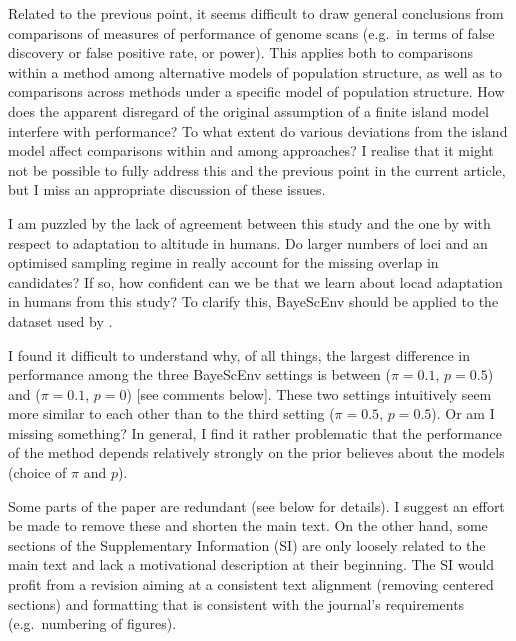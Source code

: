\documentclass[11pt]{article}
\newenvironment{my_enumerate}
{\begin{enumerate}
  \setlength{\itemsep}{2pt}
  \setlength{\parskip}{0pt}
  \setlength{\parsep}{0pt}}
{\end{enumerate}}
\begin{document}
\begin{my_enumerate}
	\item Related to the previous point, it seems difficult to draw general conclusions from comparisons of measures of performance of genome scans (e.g.\ in terms of false discovery or false positive rate, or power). This applies both to comparisons within a method among alternative models of population structure, as well as to comparisons across methods under a specific model of population structure. How does the apparent disregard of the original assumption of a finite island model interfere with performance? To what extent do various deviations from the island model affect comparisons within and among approaches? I realise that it might not be possible to fully address this and the previous point in the current article, but I miss an appropriate discussion of these issues.
	
	\item I am puzzled by the lack of agreement between this study and the one by \cite{Foll:2014fj} with respect to adaptation to altitude in humans. Do larger numbers of loci and an optimised sampling regime in \cite{Foll:2014fj} really account for the missing overlap in candidates? If so, how confident can we be that we learn about locad adaptation in humans from this study? To clarify this, BayeScEnv should be applied to the dataset used by \cite{Foll:2014fj}.%

	\item I found it difficult to understand why, of all things, the largest difference in performance among the three BayeScEnv settings is between ($\pi = 0.1$, $p = 0.5$) and ($\pi = 0.1$, $p = 0$) [see comments below]. These two settings intuitively seem more similar to each other than to the third setting ($\pi = 0.5$, $p = 0.5$). Or am I missing something? In general, I find it rather problematic that the performance of the method depends relatively strongly on the prior believes about the models (choice of $\pi$ and $p$).
	
	\item Some parts of the paper are redundant (see below for details). I suggest an effort be made to remove these and shorten the main text. On the other hand, some sections of the Supplementary Information (SI) are only loosely related to  the main text and lack a motivational description at their beginning. The SI would profit from a revision aiming at a consistent text alignment (removing centered sections) and formatting that is consistent with the journal's requirements (e.g.\ numbering of figures).
	

\end{my_enumerate}
\end{document}
